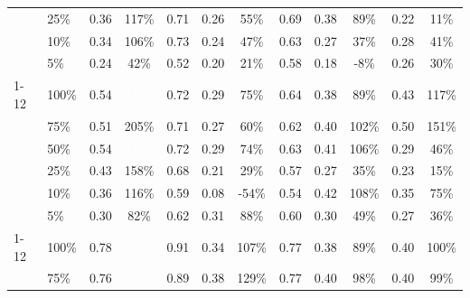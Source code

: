 \begin{longtable}{llcccccccccc}
 & 25\% & 0.36 & \cellcolor{tablegreen!33}117\% & 0.71 & 0.26 & \cellcolor{tablegreen!16}55\% & 0.69 & 0.38 & \cellcolor{tablegreen!25}89\% & 0.22 & \cellcolor{tablegreen!3}11\% \\
 & 10\% & 0.34 & \cellcolor{tablegreen!30}106\% & 0.73 & 0.24 & \cellcolor{tablegreen!13}47\% & 0.63 & 0.27 & \cellcolor{tablegreen!11}37\% & 0.28 & \cellcolor{tablegreen!12}41\% \\
 & 5\% & 0.24 & \cellcolor{tablegreen!12}42\% & 0.52 & 0.20 & \cellcolor{tablegreen!6}21\% & 0.58 & 0.18 & \cellcolor[HTML]{E8A0A0}-8\% & 0.26 & \cellcolor{tablegreen!8}30\% \\
\cmidrule(l){1-12}
\multirow{6}{*}{qwen} & 100\% & 0.54 & \cellcolor{tablegreen!64}\textcolor{white}{226\%} & 0.72 & 0.29 & \cellcolor{tablegreen!21}75\% & 0.64 & 0.38 & \cellcolor{tablegreen!26}89\% & 0.43 & \cellcolor{tablegreen!33}117\% \\
 & 75\% & 0.51 & \cellcolor{tablegreen!58}205\% & 0.71 & 0.27 & \cellcolor{tablegreen!17}60\% & 0.62 & 0.40 & \cellcolor{tablegreen!29}102\% & 0.50 & \cellcolor{tablegreen!43}151\% \\
 & 50\% & 0.54 & \cellcolor{tablegreen!64}\textcolor{white}{225\%} & 0.72 & 0.29 & \cellcolor{tablegreen!21}74\% & 0.63 & 0.41 & \cellcolor{tablegreen!30}106\% & 0.29 & \cellcolor{tablegreen!13}46\% \\
 & 25\% & 0.43 & \cellcolor{tablegreen!45}158\% & 0.68 & 0.21 & \cellcolor{tablegreen!8}29\% & 0.57 & 0.27 & \cellcolor{tablegreen!10}35\% & 0.23 & \cellcolor{tablegreen!4}15\% \\
 & 10\% & 0.36 & \cellcolor{tablegreen!33}116\% & 0.59 & 0.08 & \cellcolor[HTML]{E8A0A0}-54\% & 0.54 & 0.42 & \cellcolor{tablegreen!31}108\% & 0.35 & \cellcolor{tablegreen!21}75\% \\
 & 5\% & 0.30 & \cellcolor{tablegreen!23}82\% & 0.62 & 0.31 & \cellcolor{tablegreen!25}88\% & 0.60 & 0.30 & \cellcolor{tablegreen!14}49\% & 0.27 & \cellcolor{tablegreen!10}36\% \\
\cmidrule(l){1-12}
\multirow{6}{*}{granite} & 100\% & 0.78 & \cellcolor{tablegreen!100}\textcolor{white}{369\%} & 0.91 & 0.34 & \cellcolor{tablegreen!31}107\% & 0.77 & 0.38 & \cellcolor{tablegreen!25}89\% & 0.40 & \cellcolor{tablegreen!29}100\% \\
 & 75\% & 0.76 & \cellcolor{tablegreen!100}\textcolor{white}{357\%} & 0.89 & 0.38 & \cellcolor{tablegreen!37}129\% & 0.77 & 0.40 & \cellcolor{tablegreen!28}98\% & 0.40 & \cellcolor{tablegreen!28}99\% \\

\end{longtable}
